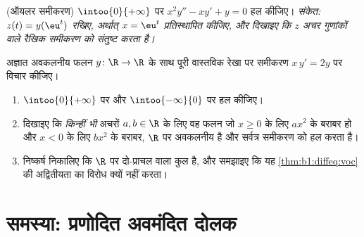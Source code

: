 \begin{exercise}[$\star\star$]\label{exo:b1:diffeq:11}
(ऑयलर समीकरण) $\intoo{0}{+\infty}$ पर $x^2 y'' - x y' + y = 0$ हल कीजिए।
\emph{संकेत: $z(t) = y(\eu^t)$ रखिए, अर्थात् $x = \eu^t$ प्रतिस्थापित कीजिए,
और दिखाइए कि $z$ अचर गुणांकों वाले रैखिक समीकरण को संतुष्ट करता है।}
\end{exercise}

\begin{exercise}[$\star\star\star$]\label{exo:b1:diffeq:12}
अज्ञात अवकलनीय फलन $y \colon \R \to \R$ के साथ पूरी वास्तविक रेखा पर समीकरण
$x\,y' = 2y$ पर विचार कीजिए।
\begin{enumerate}
  \item $\intoo{0}{+\infty}$ पर और $\intoo{-\infty}{0}$ पर हल कीजिए।
  \item दिखाइए कि \emph{किन्हीं भी} अचरों $a, b \in \R$ के लिए वह फलन जो $x
  \geq 0$ के लिए $ax^2$ के बराबर हो और $x < 0$ के लिए $bx^2$ के बराबर, $\R$
  पर अवकलनीय है और सर्वत्र समीकरण को हल करता है।
  \item निष्कर्ष निकालिए कि $\R$ पर  दो-प्राचल वाला कुल है, और
  समझाइए कि यह \cref{thm:b1:diffeq:voc} की अद्वितीयता का विरोध क्यों नहीं
  करता।
\end{enumerate}
\end{exercise}

\section{समस्या: प्रणोदित अवमंदित दोलक}

